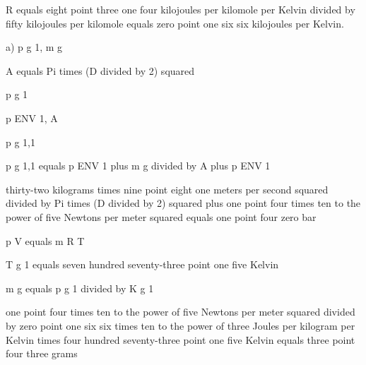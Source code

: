 R equals eight point three one four kilojoules per kilomole per Kelvin divided by fifty kilojoules per kilomole equals zero point one six six kilojoules per Kelvin.

a) p g 1, m g

A equals Pi times (D divided by 2) squared

p g 1

p ENV 1, A

p g 1,1

p g 1,1 equals p ENV 1 plus m g divided by A plus p ENV 1

thirty-two kilograms times nine point eight one meters per second squared divided by Pi times (D divided by 2) squared plus one point four times ten to the power of five Newtons per meter squared equals one point four zero bar

p V equals m R T

T g 1 equals seven hundred seventy-three point one five Kelvin

m g equals p g 1 divided by K g 1

one point four times ten to the power of five Newtons per meter squared divided by zero point one six six times ten to the power of three Joules per kilogram per Kelvin times four hundred seventy-three point one five Kelvin equals three point four three grams